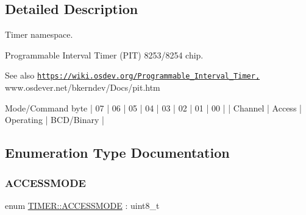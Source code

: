 \subsection{Detailed Description}
Timer namespace. 

Programmable Interval Timer (P\+IT) 8253/8254 chip.

\begin{DoxySeeAlso}{See also}
\href{https://wiki.osdev.org/Programmable_Interval_Timer,}{\tt https\+://wiki.\+osdev.\+org/\+Programmable\+\_\+\+Interval\+\_\+\+Timer,} www.\+osdever.\+net/bkerndev/\+Docs/pit.htm
\end{DoxySeeAlso}
\begin{DoxyVerb}Mode/Command byte
| 07 | 06 | 05 | 04 | 03 | 02 | 01 |     00     |
| Channel |  Access |   Operating  | BCD/Binary |
\end{DoxyVerb}
 

\subsection{Enumeration Type Documentation}
\mbox{\label{namespace_t_i_m_e_r_af9ea977bf574cbb806bde5e36476f5d0}} 
\subsubsection{\texorpdfstring{A\+C\+C\+E\+S\+S\+M\+O\+DE}{ACCESSMODE}}
{\footnotesize\ttfamily enum \hyperlink{namespace_t_i_m_e_r_af9ea977bf574cbb806bde5e36476f5d0}{T\+I\+M\+E\+R\+::\+A\+C\+C\+E\+S\+S\+M\+O\+DE} \+: uint8\+\_\+t}

